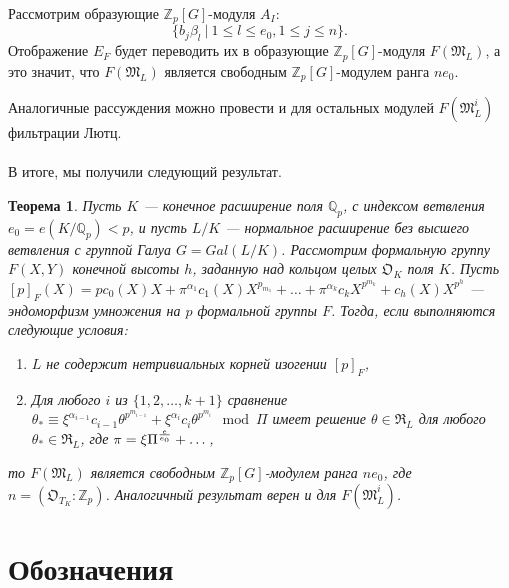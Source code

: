 \documentclass[a4paper]{article}
\newcommand{\Qp}{\mathbb{Q}_p}
\newcommand{\Zp}{\mathbb{Z}_p}
\newcommand{\ML}{\mathfrak{M}_L}
\newcommand{\OK}{\mathfrak{O}_K}
\newcommand{\OTK}{\mathfrak{O}_{T_K}}
\newcommand{\RL}{\mathfrak{R}_L}
\newcommand{\Leq}{\leqslant}
\newtheorem{theorem}{Теорема}
\begin{document}
Рассмотрим образующие $\Zp[G]$-модуля $A_I:$
$$\{b_j\beta_l\ |\ 1\Leq l\Leq e_0, 1\Leq j\Leq n\}.$$
Отображение $E_F$ будет переводить их в образующие $\Zp[G]$-модуля $F(\ML)$, а это значит, что $F(\ML)$ является свободным $\Zp[G]$-модулем ранга $ne_0$.

Аналогичные рассуждения можно провести и для остальных модулей $F(\ML^i)$ фильтрации Лютц.

\paragraph{}
В итоге, мы получили следующий результат.
\begin{theorem}
Пусть $K$ --- конечное расширение поля $\Qp$, с индексом ветвления $e_0=e(K/\Qp)<p$, и пусть $L/K$ --- нормальное расширение без высшего ветвления с группой Галуа $G=Gal(L/K)$. Рассмотрим формальную группу $F(X,Y)$ конечной высоты $h$, заданную над кольцом целых $\OK$ поля $K$. Пусть $[p]_F(X)=pc_0(X)X+\pi^{\alpha_1}c_1(X)X^{p_{m_1}}+\dots+\pi^{\alpha_k}c_kX^{p^{m_k}}+c_h(X)X^{p^h}$ --- эндоморфизм умножения на $p$ формальной группы $F$. Тогда, если выполняются следующие условия:
\begin{enumerate}
\item $L$ не содержит нетривиальных корней изогении $[p]_F$,
\item Для любого $i$ из $\{1,2,\dots,k+1\}$ сравнение $\theta_*\equiv\xi^{\alpha_{i-1}}c_{i-1}\theta^{p^{m_{i-1}}}+\xi^{\alpha_{i}}c_{i}\theta^{p^{m_{i}}}\mod\Pi$ имеет решение $\theta\in\RL$ для любого $\theta_*\in\RL$, где $\pi=\xi\Pi^{e\over e_0}+\dots$,
\end{enumerate}
то $F(\ML)$ является свободным $\Zp[G]$-модулем ранга $ne_0$, где $n=(\OTK:\Zp)$. Аналогичный результат верен и для $F(\ML^i)$.
\end{theorem}

\pagebreak

\section{Обозначения}
\end{document}
